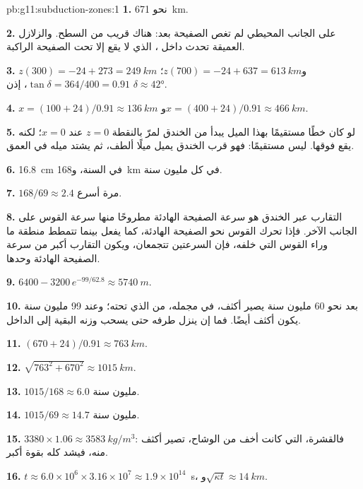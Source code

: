 \begin{solution}{pb:g11:subduction-zones:1}
\textbf{1.} نحو \qty{671}{km}.

\textbf{2.} على الجانب المحيطي لم تغص الصفيحة بعد: 
هناك قريب من السطح. والزلازل العميقة تحدث داخل ، الذي
لا يقع إلا تحت الصفيحة الراكبة.

\textbf{3.} $z(300) = -24 + 273 = \qty{249}{km}$
و$z(700) = -24 + 637 = \qty{613}{km}$؛ $\tan\delta = 364/400 = 0.91$، إذن
$\delta \approx \ang{42}$.

\textbf{4.} $x = (100 + 24)/0.91 \approx \qty{136}{km}$
و$x = (400 + 24)/0.91 \approx \qty{466}{km}$.

\textbf{5.} لو كان خطًا مستقيمًا بهذا الميل يبدأ من الخندق لمرّ
بالنقطة $z = 0$ عند $x = 0$؛ لكنه يقع فوقها.  ليس مستقيمًا: فهو قرب
الخندق يميل ميلًا ألطف، ثم يشتد ميله في العمق.

\textbf{6.} \qty{16.8}{cm} في السنة، و\qty{168}{km} في كل مليون سنة.

\textbf{7.} $168/69 \approx 2.4$ مرة أسرع.

\textbf{8.} التقارب عبر الخندق هو سرعة الصفيحة الهادئة
مطروحًا منها سرعة القوس على الجانب الآخر. فإذا تحرك القوس نحو
الصفيحة الهادئة، كما يفعل بينما تتمطط منطقة ما وراء القوس التي خلفه، فإن
السرعتين تتجمعان، ويكون التقارب أكبر من سرعة
الصفيحة الهادئة وحدها.

\textbf{9.} $6400 - 3200\,e^{-99/62.8} \approx \qty{5740}{m}$.

\textbf{10.} بعد نحو 60 مليون سنة يصير  أكثف، في
مجمله، من  الذي تحته؛ وعند 99 مليون سنة يكون أكثف
أيضًا. فما إن ينزل طرفه حتى يسحب وزنه البقية إلى الداخل.

\textbf{11.} $(670 + 24)/0.91 \approx \qty{763}{km}$.

\textbf{12.} $\sqrt{763^2 + 670^2} \approx \qty{1015}{km}$.

\textbf{13.} $1015/168 \approx 6.0$ مليون سنة.

\textbf{14.} $1015/69 \approx 14.7$ مليون سنة.

\textbf{15.} $3380 \times 1.06 \approx \qty{3583}{kg/m^3}$: فالقشرة، التي كانت
أخف من الوشاح، تصير أكثف منه، فيشد  كله
بقوة أكبر.

\textbf{16.} $t \approx 6.0 \times 10^6 \times 3.16 \times 10^7 \approx
1.9 \times 10^{14}$~\unit{s}، و$\sqrt{\kappa t} \approx \qty{14}{km}$.


\end{solution}
